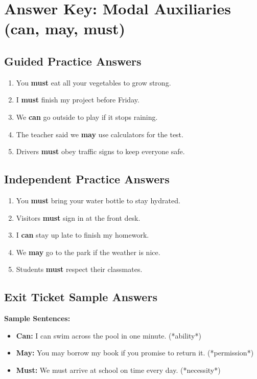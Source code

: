 \documentclass[12pt]{article}
\begin{document}
\section*{Answer Key: Modal Auxiliaries (can, may, must)}

\subsection*{Guided Practice Answers}
\begin{enumerate}[itemsep=1em]
    \item You \textbf{must} eat all your vegetables to grow strong.
    \item I \textbf{must} finish my project before Friday.
    \item We \textbf{can} go outside to play if it stops raining.
    \item The teacher said we \textbf{may} use calculators for the test.
    \item Drivers \textbf{must} obey traffic signs to keep everyone safe.
\end{enumerate}

\subsection*{Independent Practice Answers}
\begin{enumerate}[itemsep=1em]
    \item You \textbf{must} bring your water bottle to stay hydrated.
    \item Visitors \textbf{must} sign in at the front desk.
    \item I \textbf{can} stay up late to finish my homework.
    \item We \textbf{may} go to the park if the weather is nice.
    \item Students \textbf{must} respect their classmates.
\end{enumerate}

\subsection*{Exit Ticket Sample Answers}
\textbf{Sample Sentences:}
\begin{itemize}
    \item \textbf{Can:} I can swim across the pool in one minute. (*ability*)
    \item \textbf{May:} You may borrow my book if you promise to return it. (*permission*)
    \item \textbf{Must:} We must arrive at school on time every day. (*necessity*)
\end{itemize}
\end{document}
